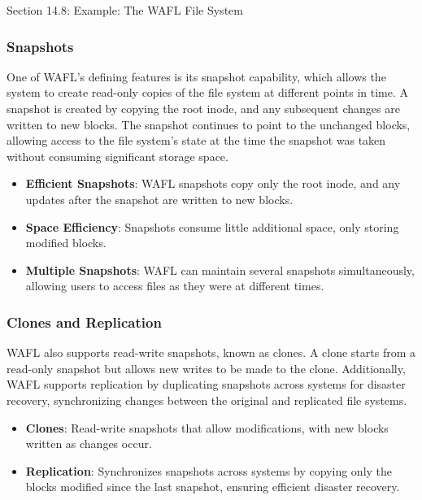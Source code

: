 \begin{notes}{Section 14.8: Example: The WAFL File System}
    \subsubsection*{Snapshots}
    
    One of WAFL's defining features is its snapshot capability, which allows the system to create read-only copies of the file system at different points in time. A snapshot is created by copying the 
    root inode, and any subsequent changes are written to new blocks. The snapshot continues to point to the unchanged blocks, allowing access to the file system's state at the time the snapshot was 
    taken without consuming significant storage space.
    
    \begin{highlight}[Snapshots]
    
        \begin{itemize}
            \item \textbf{Efficient Snapshots}: WAFL snapshots copy only the root inode, and any updates after the snapshot are written to new blocks.
            \item \textbf{Space Efficiency}: Snapshots consume little additional space, only storing modified blocks.
            \item \textbf{Multiple Snapshots}: WAFL can maintain several snapshots simultaneously, allowing users to access files as they were at different times.
        \end{itemize}
    
    \end{highlight}
    
    \subsubsection*{Clones and Replication}
    
    WAFL also supports read-write snapshots, known as clones. A clone starts from a read-only snapshot but allows new writes to be made to the clone. Additionally, WAFL supports replication by duplicating 
    snapshots across systems for disaster recovery, synchronizing changes between the original and replicated file systems.
    
    \begin{highlight}
    
        \begin{itemize}
            \item \textbf{Clones}: Read-write snapshots that allow modifications, with new blocks written as changes occur.
            \item \textbf{Replication}: Synchronizes snapshots across systems by copying only the blocks modified since the last snapshot, ensuring efficient disaster recovery.
        \end{itemize}
    

\end{highlight}
\end{notes}

